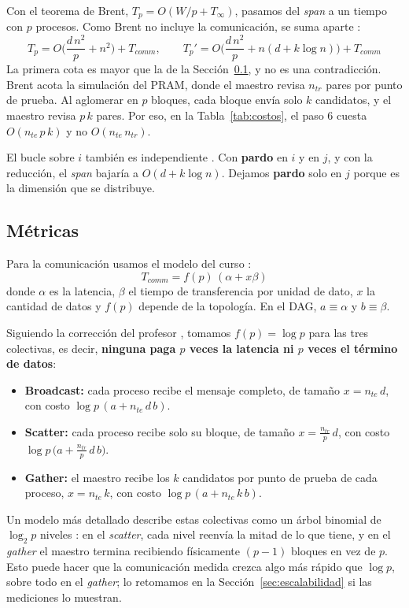 \documentclass[11pt,a4paper]{article}
\newcommand{\ntr}{n_{tr}}
\newcommand{\nte}{n_{te}}
\newcommand{\Tinf}{T_\infty}
\begin{document}
Con el teorema de Brent, $T_p=O(W/p+\Tinf)$, pasamos del \textit{span} a un tiempo con $p$ procesos. Como Brent no incluye la comunicación, se suma aparte \cite{slides}:
\[
T_p=O\Big(\frac{d\,n^2}{p}+n^2\Big)+T_{comm},
\qquad
T_p'=O\Big(\frac{d\,n^2}{p}+n(d+k\log n)\Big)+T_{comm}
\]
La primera cota es mayor que la de la Sección~\ref{sec:metricas}, y no es una contradicción. Brent acota la simulación del PRAM, donde el maestro revisa $\ntr$ pares por punto de prueba. Al aglomerar en $p$ bloques, cada bloque envía solo $k$ candidatos, y el maestro revisa $p\,k$ pares. Por eso, en la Tabla~\ref{tab:costos}, el paso 6 cuesta $O(\nte\,p\,k)$ y no $O(\nte\,\ntr)$.

El bucle sobre $i$ también es independiente \cite{enunciado}. Con \textbf{pardo} en $i$ y en $j$, y con la reducción, el \textit{span} bajaría a $O(d+k\log n)$. Dejamos \textbf{pardo} solo en $j$ porque es la dimensión que se distribuye.

\subsection{Métricas}
\label{sec:metricas}

Para la comunicación usamos el modelo del curso \cite{slides}:
\[
T_{comm}=f(p)\,(\alpha+x\beta)
\]
donde $\alpha$ es la latencia, $\beta$ el tiempo de transferencia por unidad de dato, $x$ la cantidad de datos y $f(p)$ depende de la topología. En el DAG, $a\equiv\alpha$ y $b\equiv\beta$.

Siguiendo la corrección del profesor \cite{slides,correo-profesor}, tomamos $f(p)=\log p$ para las tres colectivas, es decir, \textbf{ninguna paga $p$ veces la latencia ni $p$ veces el término de datos}:
\begin{itemize}
  \item \textbf{Broadcast:} cada proceso recibe el mensaje completo, de tamaño $x=\nte\, d$, con costo $\log p\,(a+\nte\, d\, b)$.
  \item \textbf{Scatter:} cada proceso recibe solo su bloque, de tamaño $x=\tfrac{\ntr}{p}\,d$, con costo $\log p\,\big(a+\tfrac{\ntr}{p}\,d\,b\big)$.
  \item \textbf{Gather:} el maestro recibe los $k$ candidatos por punto de prueba de cada proceso, $x=\nte\, k$, con costo $\log p\,(a+\nte\, k\, b)$.
\end{itemize}
Un modelo más detallado describe estas colectivas como un árbol binomial de $\log_2 p$ niveles \cite{thakur}: en el \textit{scatter}, cada nivel reenvía la mitad de lo que tiene, y en el \textit{gather} el maestro termina recibiendo físicamente $(p-1)$ bloques en vez de $p$. Esto puede hacer que la comunicación medida crezca algo más rápido que $\log p$, sobre todo en el \textit{gather}; lo retomamos en la Sección~\ref{sec:escalabilidad} si las mediciones lo muestran.
\end{document}
